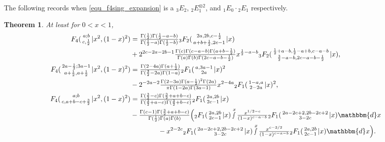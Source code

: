 \documentclass[12pt]{article}
\newcommand{\dd}[0] {\mathbbm{d}}
\numberwithin{equation}{section}
\newtheorem{theorem}{Theorem}[section]
\newcommand{\Head}[3] {{}_{#1}{#2}_{#3}}
\newcommand{\ArgS}[3] {( \begin{smallmatrix} #1 \\ #2 \end{smallmatrix} | {#3})}
\newcommand{\appellFfourS}[6]    {F_4 \ArgS{{#1};{#2}}{{#3},{#4}}{{#5},{#6}}}
\begin{document}
The following records when \eqref{equ_f4sing_expansion} is a $\Head3E2$,  $\Head2E1^{\otimes 2}$, and  $\Head1E0 \cdot\Head2E1$ respectively.
\begin{theorem}
\label{thm_f4sing_special}
At least for $0<x<1$,
\begin{align*}
\appellFfourS{a}{b}{c}{\frac12}{x^2}{(1-x)^2}
&= \tfrac{\Gamma(\frac{1}{2}) \Gamma(\frac{1}{2}-a-b)}{\Gamma(\frac{1}{2}-a) \Gamma(\frac{1}{2}-b)} \Head{3}{F}{2} \ArgS{2a,2b,c-\frac12}{a+b+\frac12,2c-1}{x}\\
&+ 2^{2 c-2 a-2 b-1} \tfrac{\Gamma (c) \Gamma(c-a-b) \Gamma(a+b-\frac{1}{2})}{\Gamma (a) \Gamma (b) \Gamma(2c-a-b-\frac{1}{2})} x^{\frac12-a-b} \Head3F2 \ArgS{\frac{1}{2}+a-b,\frac{1}{2}-a+b,c-a-b}{\frac{3}{2}-a-b,2c-a-b-\frac{1}{2}}{x} \text{,}\\
\appellFfourS{2a-\frac12}{3a-1}{a+\frac12}{a+\frac12}{x^2}{(1-x)^2} &= \tfrac{\Gamma (2-4 a) \Gamma(a+\frac{1}{2})}{\Gamma(\frac{3}{2}-2
   a) \Gamma (1-a)} \Head2F1 \ArgS{a,3 a-1}{2 a}{x}^2\\
   &-2^{-2 a-2}\tfrac{\Gamma(2-3 a) \Gamma(a-\frac{1}{2})^2 \Gamma (2 a)}{\pi  \Gamma (1-2 a) \Gamma (3
   a-1)}x^{2-4 a} \Head2F1 \ArgS{1-a,a}{2-2 a}{x}^2 \text{,}\\
\appellFfourS{a}{b}{c}{a+b-c+\frac32}{x^2}{(1-x)^2} &= \tfrac{\Gamma(\frac32-c) \Gamma(\frac32+a+b-c)}{\Gamma(\frac32+a-c) \Gamma(\frac32+b-c)} \Head{2}{F}{1} \ArgS{2a,2b}{2c-1}{x}\\
 &- \tfrac{\Gamma (c-1) \Gamma(\frac32+a+b-c)}{\Gamma(\frac12) \Gamma (a) \Gamma (b)} \Big( \Head2F1 \ArgS{2 a,2 b}{2 c-1}{x} \smallint^x \tfrac{x^{1/2-c}}{(1-x)^{c-a-b}} \Head2F1\ArgS{2a-2c+2,2b-2c+2}{3-2 c}{x} \dd x \\
 & \quad \quad \quad \quad  - x^{2-2 c} \Head2F1 \ArgS{2a-2c+2,2b-2c+2}{3-2 c}{x}
   \smallint^x \tfrac{x^{c-3/2}}{(1-x)^{c-a-b}} \Head2F1 \ArgS{2 a,2 b}{2 c-1}{x} \dd x \Big)\text{.}
\end{align*}
\end{theorem}
\end{document}
